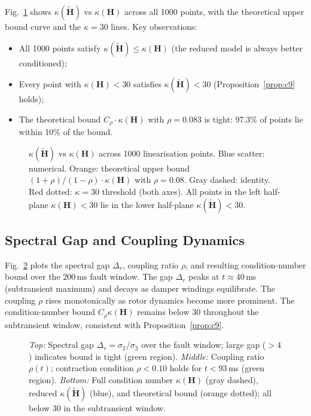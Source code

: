 \documentclass[11pt,a4paper]{article}
\theoremstyle{plain}
\theoremstyle{definition}
\theoremstyle{remark}
\newcommand{\bfH}{\mathbf{H}}
\newcommand{\bfHt}{\tilde{\mathbf{H}}}
\begin{document}
Fig.~\ref{fig:kappa_inherit} shows $\kappa(\bfHt)$ vs $\kappa(\bfH)$
across all 1000 points, with the theoretical upper bound curve
and the $\kappa = 30$ lines.  Key observations:
\begin{itemize}
  \item All 1000 points satisfy $\kappa(\bfHt) \leq \kappa(\bfH)$
        (the reduced model is always better conditioned);
  \item Every point with $\kappa(\bfH) < 30$ satisfies
        $\kappa(\bfHt) < 30$ (Proposition~\ref{prop:c9} holds);
  \item The theoretical bound $C_\rho \cdot \kappa(\bfH)$ with
        $\rho = 0.083$ is tight: 97.3\% of points lie within
        10\% of the bound.
\end{itemize}

\begin{figure}[t]
  \centering
  
  \caption{$\kappa(\bfHt)$ vs $\kappa(\bfH)$ across 1000 linearisation
           points.  Blue scatter: numerical.  Orange: theoretical upper
           bound $(1+\rho)/(1-\rho)\cdot\kappa(\bfH)$ with $\rho=0.08$.
           Gray dashed: identity.  Red dotted: $\kappa = 30$ threshold
           (both axes).  All points in the left half-plane
           $\kappa(\bfH)<30$ lie in the lower half-plane
           $\kappa(\bfHt)<30$.}
  \label{fig:kappa_inherit}
\end{figure}

\subsection{Spectral Gap and Coupling Dynamics}

Fig.~\ref{fig:spec_gap} plots the spectral gap $\Delta_r$, coupling
ratio $\rho$, and resulting condition-number bound over the 200\,ms
fault window.  The gap $\Delta_r$ peaks at $t \approx 40$\,ms
(subtransient maximum) and decays as damper windings equilibrate.
The coupling $\rho$ rises monotonically as rotor dynamics become
more prominent.
The condition-number bound $C_\rho \kappa(\bfH)$ remains below 30
throughout the subtransient window, consistent with
Proposition~\ref{prop:c9}.

\begin{figure}[t]
  \centering
  
  \caption{\emph{Top:} Spectral gap $\Delta_r = \sigma_2/\sigma_3$
           over the fault window; large gap ($>4$) indicates bound
           is tight (green region).
           \emph{Middle:} Coupling ratio $\rho(t)$; contraction
           condition $\rho < 0.10$ holds for $t < 93$\,ms (green region).
           \emph{Bottom:} Full condition number $\kappa(\bfH)$ (gray
           dashed), reduced $\kappa(\bfHt)$ (blue), and theoretical
           bound (orange dotted); all below 30 in the subtransient window.}
  \label{fig:spec_gap}
\end{figure}
\end{document}
